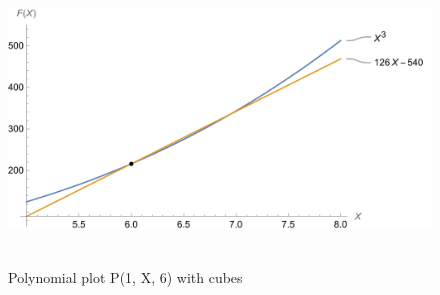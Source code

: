 ﻿\begin{figure}[H]
    \centering
    \includegraphics[width=1\textwidth]{sections/images/01_plots_polynomial_p1_n6_with_cubes}
    ~\caption{Polynomial plot P(1, X, 6) with cubes}\label{fig:figure7}
\end{figure}
